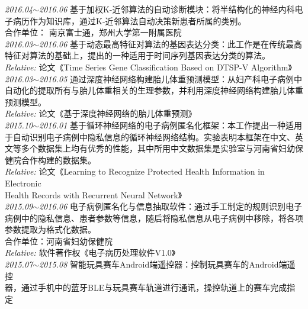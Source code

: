 \documentclass[line, margin]{res}
\newcommand{\xiaowu}{\fontsize{9pt}{15.75pt}\selectfont} %
\begin{document}
\begin{resume}
 { 
 {\sl 2016.04$\sim$2016.06} 基于加权K-近邻算法的自动诊断模块：{ 将半结构化的神经内科电\\
 子病历作为知识库，通过K-近邻算法自动决策新患者所属的类别。\\
 {\xiaowu 合作单位： 南京富士通，郑州大学第一附属医院} }\\
[7pt] 
 {\sl 2016.03$\sim$2016.06} 基于动态最高特征对算法的基因表达分类：{ 此工作是在传统最高\\
 特征对算法的基础上，提出的一种适用于时间序列基因表达分类的算法。}\\
 {\sl\xiaowu Relative:} {\xiaowu 论文《Time Series Gene Classification Based on DTSP-V Algorithm》}\\
[7pt] 
 {\sl 2016.03$\sim$2016.05} 通过深度神经网络构建胎儿体重预测模型：{ 从妇产科电子病例中\\
 自动化的提取所有与胎儿体重相关的生理参数，并利用深度神经网络构建胎儿体重\\
 预测模型。} \\
 {\sl\xiaowu Relative:} {\xiaowu 论文《基于深度神经网络的胎儿体重预测》} \\
[7pt]
 {\sl 2015.10$\sim$2016.01} 基于循环神经网络的电子病例匿名化框架：{ 本工作提出一种适用\\
 于自动识别电子病例中隐私信息的循环神经网络结构。实验表明本框架在中文、英\\
 文等多个数据集上均有优秀的性能，其中所用中文数据集是实验室与河南省妇幼保\\
 健院合作构建的数据集。} \\
 {\sl\xiaowu Relative:} {\xiaowu 论文《Learning to Recognize Protected Health Information in  Electronic \\
 Health Records with Recurrent Neural Network》}\\
[7pt] 
 {\sl 2015.09$\sim$2016.06} 电子病例匿名化与信息抽取软件：{ 通过手工制定的规则识别电子\\
 病例中的隐私信息、患者参数等信息，随后将隐私信息从电子病例中移除，将各项\\
 参数提取为格式化数据。\\
 {\xiaowu 合作单位：河南省妇幼保健院} } \\
 {\sl\xiaowu Relative:} {\xiaowu 软件著作权《电子病历处理软件V1.0》} \\
[7pt]
 {\sl 2015.07$\sim$2015.08} 智能玩具赛车Android端遥控器：{ 控制玩具赛车的Android端遥控\\
 器，通过手机中的蓝牙BLE与玩具赛车轨道进行通讯，操控轨道上的赛车完成指定\\
}}
\end{resume}
\end{document}
